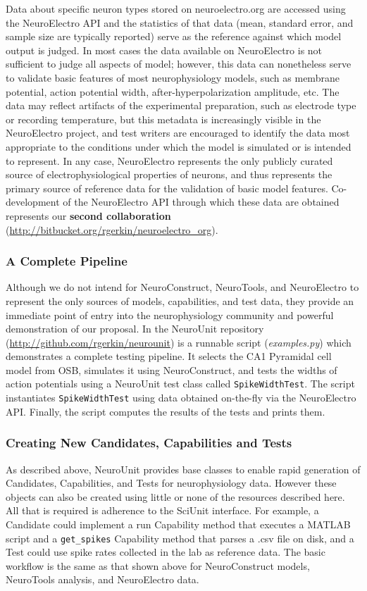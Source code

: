 \documentclass[a4paper,12pt]{article}
\begin{document}
Data about specific neuron types stored on neuroelectro.org are accessed using the NeuroElectro API and the statistics of that data (mean, standard error, and sample size are typically reported) serve as the reference against which model output is judged.  In most cases the data available on NeuroElectro is not sufficient to judge all aspects of model; however, this data can nonetheless serve to validate basic features of most neurophysiology models, such as membrane potential, action potential width, after-hyperpolarization amplitude, etc.  The data may reflect artifacts of the experimental preparation, such as electrode type or recording temperature, but this metadata is increasingly visible in the NeuroElectro project, and test writers are encouraged to identify the data most appropriate to the conditions under which the model is simulated or is intended to represent.  In any case, NeuroElectro represents the only publicly curated source of electrophysiological properties of neurons, and thus represents the primary source of reference data for the validation of basic model features.  Co-development of the NeuroElectro API through which these data are obtained represents our \textbf{second collaboration} (\url{http://bitbucket.org/rgerkin/neuroelectro_org}).  

\subsubsection{A Complete Pipeline}
Although we do not intend for NeuroConstruct, NeuroTools, and NeuroElectro to represent the only sources of models, capabilities, and test data, they provide an immediate point of entry into the neurophysiology community and powerful demonstration of our proposal.  In the NeuroUnit repository (\url{http://github.com/rgerkin/neurounit}) is a runnable script (\textit{examples.py}) which demonstrates a complete testing pipeline.  It selects the CA1 Pyramidal cell model from OSB, simulates it using NeuroConstruct, and tests the widths of action potentials using a NeuroUnit test class called \verb|SpikeWidthTest|.  The script instantiates \verb|SpikeWidthTest| using data obtained on-the-fly via the NeuroElectro API.  Finally, the script computes the results of the tests and prints them.    

\subsubsection{Creating New Candidates, Capabilities and Tests}
As described above, NeuroUnit provides base classes to enable rapid generation of Candidates, Capabilities, and Tests for neurophysiology data.  However these objects can also be created using little or none of the resources described here.  All that is required is adherence to the SciUnit interface.  For example, a Candidate could implement a run Capability method that executes a MATLAB script and a \verb|get_spikes| Capability method that parses a .csv file on disk, and a Test could use spike rates collected in the lab as reference data. The basic workflow is the same as that shown above for NeuroConstruct models, NeuroTools analysis, and NeuroElectro data. 
\end{document}
